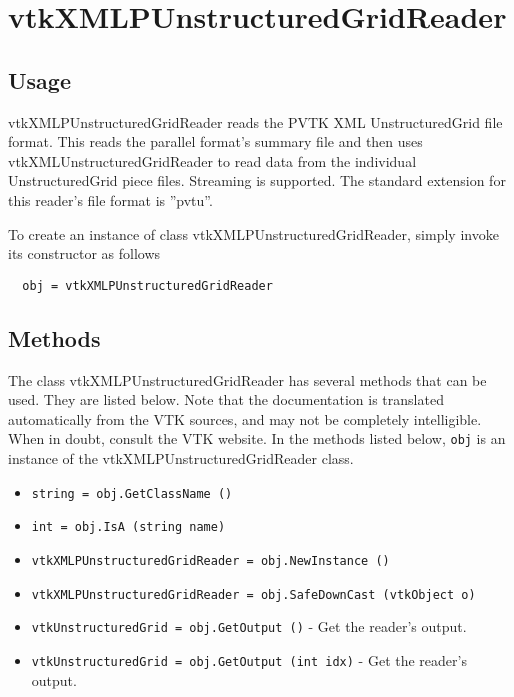 \section{vtkXMLPUnstructuredGridReader}

\subsection{Usage}

 vtkXMLPUnstructuredGridReader reads the PVTK XML UnstructuredGrid
 file format.  This reads the parallel format's summary file and
 then uses vtkXMLUnstructuredGridReader to read data from the
 individual UnstructuredGrid piece files.  Streaming is supported.
 The standard extension for this reader's file format is ''pvtu''.

To create an instance of class vtkXMLPUnstructuredGridReader, simply
invoke its constructor as follows
\begin{verbatim}
  obj = vtkXMLPUnstructuredGridReader
\end{verbatim}
\subsection{Methods}

The class vtkXMLPUnstructuredGridReader has several methods that can be used.
  They are listed below.
Note that the documentation is translated automatically from the VTK sources,
and may not be completely intelligible.  When in doubt, consult the VTK website.
In the methods listed below, \verb|obj| is an instance of the vtkXMLPUnstructuredGridReader class.
\begin{itemize}
\item  \verb|string = obj.GetClassName ()|

\item  \verb|int = obj.IsA (string name)|

\item  \verb|vtkXMLPUnstructuredGridReader = obj.NewInstance ()|

\item  \verb|vtkXMLPUnstructuredGridReader = obj.SafeDownCast (vtkObject o)|

\item  \verb|vtkUnstructuredGrid = obj.GetOutput ()| -  Get the reader's output.

\item  \verb|vtkUnstructuredGrid = obj.GetOutput (int idx)| -  Get the reader's output.

\end{itemize}
